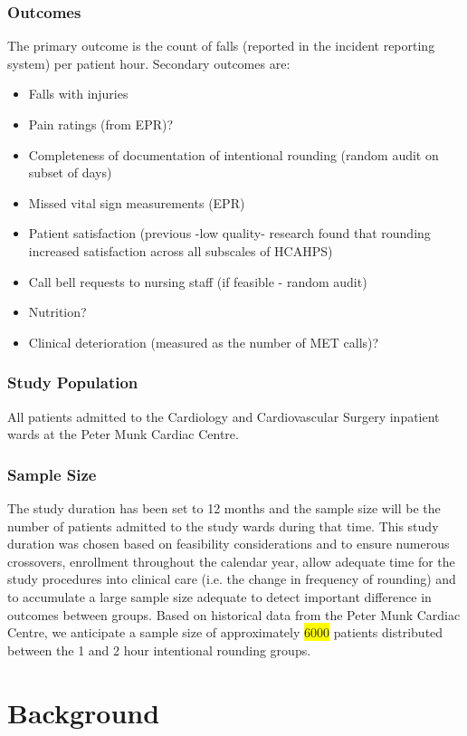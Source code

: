 \documentclass[12pt]{article}
\begin{document}
\subsubsection*{Outcomes}
The primary outcome is the count of falls (reported in the incident reporting system) per patient hour. Secondary outcomes are:
\begin{itemize}
    \item Falls with injuries
    \item Pain ratings (from EPR)?
    \item Completeness of documentation of intentional rounding (random audit on subset of days)
    \item Missed vital sign measurements (EPR)
    \item Patient satisfaction (previous -low quality- research found that rounding increased satisfaction across all subscales of HCAHPS)
    \item Call bell requests to nursing staff (if feasible - random audit)
    \item Nutrition?
    \item Clinical deterioration (measured as the number of MET calls)?
\end{itemize}

\subsubsection*{Study Population}
All patients admitted to the Cardiology and Cardiovascular Surgery inpatient wards at the Peter Munk Cardiac Centre. 

\subsubsection*{Sample Size}
The study duration has been set to 12 months and the sample size will be the number of patients admitted to the study wards during that time. This study duration was chosen based on feasibility considerations and to ensure numerous crossovers, enrollment throughout the calendar year, allow adequate time for the study procedures into clinical care (i.e. the change in frequency of rounding) and to accumulate a large sample size adequate to detect important difference in outcomes between groups. Based on historical data from the Peter Munk Cardiac Centre, we anticipate a sample size of approximately \colorbox{yellow}{6000} patients distributed between the 1 and 2 hour intentional rounding groups.


\section{Background}
\end{document}
